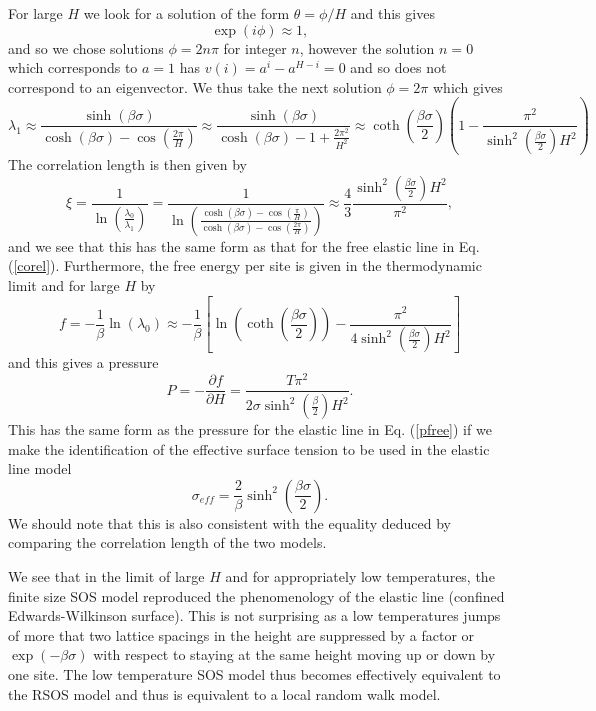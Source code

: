 For large $H$ we look for a solution of the form $\theta=\phi/H$ and this gives
\begin{equation}
    \exp(i\phi) \approx  1,
\end{equation}
and so we chose solutions $\phi = 2n\pi$ for integer $n$, however the solution $n=0$ which corresponds to $a=1$ has $v(i) = a^i-a^{H-i} =0$ and so does not correspond to an eigenvector. We thus take the next solution $\phi = 2\pi$ which gives
\begin{equation}
    \lambda_1 \approx \frac{\sinh(\beta\sigma)}{\cosh(\beta\sigma) - \cos(\frac{2\pi}{H})} \approx \frac{\sinh(\beta\sigma)}{\cosh(\beta\sigma) - 1+ \frac{2\pi^2}{H^2}}\approx \coth(\frac{\beta\sigma}{2})(1 - \frac{\pi^2}{\sinh^2(\frac{\beta\sigma}{2}) H^2})
\end{equation}
The correlation length is then given by
\begin{equation}
    \xi =\frac{1}{\ln(\frac{\lambda_0}{\lambda_1})} = \frac{1}{\ln(\frac{\cosh(\beta\sigma) - \cos(\frac{\pi}{H})}{\cosh(\beta\sigma) - \cos(\frac{2\pi}{H})})}\approx  \frac{4}{3}\frac{\sinh^2(\frac{\beta\sigma}{2})H^2}{\pi^2},
\end{equation}
and we see that this has the same form as that for the free elastic line  in Eq. (\ref{corel}).
Furthermore, the  free energy per site is given in the thermodynamic limit and for large $H$ by
\begin{equation}
    f=-\frac{1}{\beta}\ln(\lambda_0) \approx -\frac{1}{\beta}\left[ \ln(\coth(\frac{\beta\sigma}{2}))- \frac{\pi^2}{4\sinh^2(\frac{\beta\sigma}{2}) H^2}\right]
\end{equation}
and this gives a pressure
\begin{equation}
    P= -\frac{\partial f}{\partial H}= \frac{T\pi^2}{2\sigma\sinh^2(\frac{\beta}{2}) H^2}.
\end{equation}
This has the same form as the pressure for the elastic line in Eq. (\ref{pfree}) if we make the identification of the effective surface tension to be used in the elastic line model
\begin{equation}
    \sigma_{eff} = \frac{2}{\beta}\sinh^2(\frac{\beta\sigma}{2}).
\end{equation}
We should note that this is also consistent with the equality deduced by comparing the correlation length of the two models.

We see that in the limit of large $H$ and for appropriately low temperatures, the finite size SOS model reproduced the phenomenology of the elastic line (confined Edwards-Wilkinson surface). 
This is not surprising as a low temperatures jumps of more that two lattice spacings in the height are suppressed by a factor or $\exp(-\beta\sigma)$ with respect to staying at the same height moving up or down by one site. The low temperature SOS model thus becomes effectively equivalent to the RSOS model and thus is equivalent to a local random walk model. 


